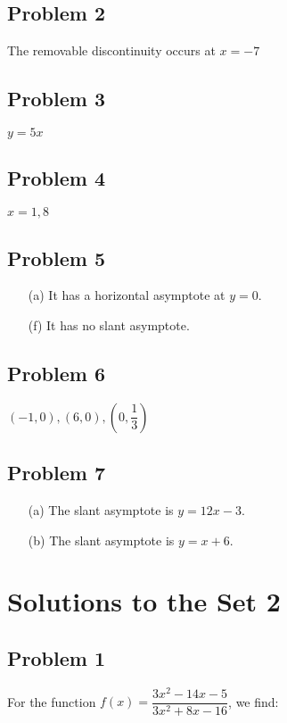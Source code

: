 \documentclass[12pt]{article}
\begin{document}
\subsection*{Problem 2}
The removable discontinuity occurs at \(x=-7\)
\subsection*{Problem 3}
\(y=5x\)
\subsection*{Problem 4}
\(x=1,8\)
\subsection*{Problem 5}
\begin{enumerate}
    \item[(a)] It has a horizontal asymptote at \(y=0\).
    \item[(f)] It has no slant asymptote.
\end{enumerate}
\subsection*{Problem 6}
\((-1,0),(6,0),(0,\dfrac{1}{3})\)
\subsection*{Problem 7}
\begin{enumerate}
    \item[(a)] The slant asymptote is \(y = 12x - 3\).
    \item[(b)] The slant asymptote is \(y = x + 6\).
\end{enumerate}

\section*{Solutions to the Set 2}
\subsection*{Problem 1}
For the function \( f(x) = \dfrac{3x^2 - 14x - 5}{3x^2 + 8x - 16} \), we find:
\end{document}
